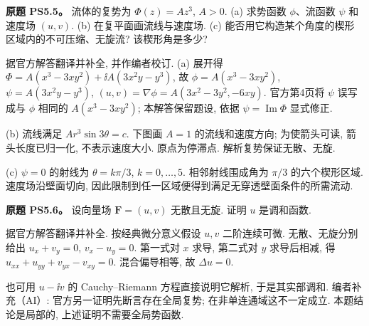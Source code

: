 \begin{exercise}
\textbf{原题 PS5.5。}\label{ass:ps5-5}
流体的复势为 $\Phi(z)=Az^3$, $A>0$.
(a) 求势函数 $\phi$、流函数 $\psi$ 和速度场 $(u,v)$.
(b) 在复平面画流线与速度场.
(c) 能否用它构造某个角度的楔形区域内的不可压缩、无旋流? 该楔形角是多少?
\end{exercise}
\begin{solution}
据官方解答翻译并补全, 并作编者校订.
(a) 展开得 $\Phi=A(x^3-3xy^2)+\ii A(3x^2y-y^3)$, 故 $\phi=A(x^3-3xy^2)$, $\psi=A(3x^2y-y^3)$, $(u,v)=\nabla\phi=A(3x^2-3y^2,-6xy)$. 官方第4页将 $\psi$ 误写成与 $\phi$ 相同的 $A(x^3-3xy^2)$; 本解答保留题设, 依据 $\psi=\operatorname{Im}\Phi$ 显式修正.

(b) 流线满足 $Ar^3\sin3\theta=c$. 下图画 $A=1$ 的流线和速度方向; 为使箭头可读, 箭头长度已归一化, 不表示速度大小. 原点为停滞点. 解析复势保证无散、无旋.
\begin{center}
\end{center}
(c) $\psi=0$ 的射线为 $\theta=k\pi/3$, $k=0,\ldots,5$. 相邻射线围成角为 $\pi/3$ 的六个楔形区域. 速度场沿壁面切向, 因此限制到任一区域便得到满足无穿透壁面条件的所需流动.
\end{solution}

\begin{exercise}
\textbf{原题 PS5.6。}\label{ass:ps5-6}
设向量场 $\mathbf F=(u,v)$ 无散且无旋. 证明 $u$ 是调和函数.
\end{exercise}
\begin{solution}
据官方解答翻译并补全. 按经典微分意义假设 $u,v$ 二阶连续可微. 无散、无旋分别给出 $u_x+v_y=0$, $v_x-u_y=0$. 第一式对 $x$ 求导, 第二式对 $y$ 求导后相减, 得 $u_{xx}+u_{yy}+v_{yx}-v_{xy}=0$. 混合偏导相等, 故 $\Delta u=0$.

也可用 $u-\ii v$ 的 Cauchy--Riemann 方程直接说明它解析, 于是其实部调和. 编者补充（AI）: 官方另一证明先断言存在全局复势; 在非单连通域这不一定成立. 本题结论是局部的, 上述证明不需要全局势函数.
\end{solution}

